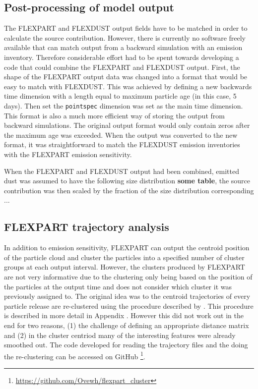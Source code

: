 \subsection{Post-processing of model output}
The FLEXPART and FLEXDUST output fields have to be matched in order to calculate the source contribution. However, there is currently no software freely available that can match output from a backward simulation with an emission inventory. Therefore considerable effort had to be spent towards developing a code that could combine the FLEXPART and FLEXDUST output. First, the shape of the FLEXPART output data was changed into a format that would be easy to match with FLEXDUST. This was achieved by defining a new backwards time dimension with a length equal to maximum particle age (in this case, 5 days). Then set the \verb|pointspec| dimension was set as the main time dimension. This format is also a much more efficient way of storing the output from backward simulations. The original output format would only contain zeros after the maximum age was exceeded. When the output was converted to the new format, it was straightforward to match the FLEXDUST emission inventories with the FLEXPART emission sensitivity. 

When the FLEXPART and FLEXDUST output had been combined, emitted dust was assumed to have the following size distribution \textbf{some table}, the source contribution was then scaled by the fraction of the size distribution corresponding ...  

\subsection{FLEXPART trajectory analysis}
In addition to emission sensitivity, FLEXPART can output the centroid position of the particle cloud and cluster the particles into a specified number of cluster groups at each output interval. 
However, the clusters produced by FLEXPART are not very informative due to the clustering only being based on the position of the particles at the output time and does not consider which cluster it was previously assigned to.
The original idea was to the centroid trajectories of every particle release are re-clustered using the procedure described by \textcite{dorling1992cluster}.
This procedure is described in more detail in Appendix . However this did not work out in the end for two reasons, (1) the challenge of defining an appropriate distance matrix and (2) in the cluster centriod many of the interesting features were already smoothed out. The code developed for reading the trajectory files and the doing the re-clustering can be accessed on GitHub \footnote{\url{https://github.com/Ovewh/flexpart_cluster}}. 

